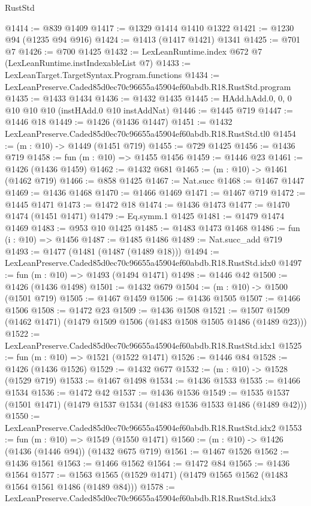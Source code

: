 \begin{lexlean}{RustStd}
\begin{coremodule}
@1414 := @839 @1409
@1417 := @1329 @1414 @1410 @1322
@1421 := @1230 @94 (@1235 @94 @916)
@1424 := @1413 (@1417 @1421) @1341
@1425 := @701 @7
@1426 := @700 @1425
@1432 := LexLeanRuntime.index @672 @7 (LexLeanRuntime.instIndexableList @7)
@1433 := LexLeanTarget.TargetSyntax.Program.functions
@1434 := LexLeanPreserve.Caded85d0ec70c96655a45904ef60abdb.R18.RustStd.program
@1435 := @1433 @1434
@1436 := @1432 @1435
@1445 := HAdd.hAdd.{0, 0, 0} @10 @10 @10 (instHAdd.{0} @10 instAddNat)
@1446 := @1445 @719
@1447 := @1446 @18
@1449 := @1426 (@1436 @1447)
@1451 := @1432 LexLeanPreserve.Caded85d0ec70c96655a45904ef60abdb.R18.RustStd.tl0
@1454 := (m : @10) -> @1449 (@1451 @719)
@1455 := @729 @1425
@1456 := @1436 @719
@1458 := fun (m : @10) => @1455 @1456
@1459 := @1446 @23
@1461 := @1426 (@1436 @1459)
@1462 := @1432 @681
@1465 := (m : @10) -> @1461 (@1462 @719)
@1466 := @858 @1425
@1467 := Nat.succ
@1468 := @1467 @1447
@1469 := @1436 @1468
@1470 := @1466 @1469
@1471 := @1467 @719
@1472 := @1445 @1471
@1473 := @1472 @18
@1474 := @1436 @1473
@1477 := @1470 @1474 (@1451 @1471)
@1479 := Eq.symm.{1} @1425
@1481 := @1479 @1474 @1469
@1483 := @953 @10 @1425
@1485 := @1483 @1473 @1468
@1486 := fun (i : @10) => @1456
@1487 := @1485 @1486
@1489 := Nat.succ_add @719
@1493 := @1477 (@1481 (@1487 (@1489 @18)))
@1494 := LexLeanPreserve.Caded85d0ec70c96655a45904ef60abdb.R18.RustStd.idx0
@1497 := fun (m : @10) => @1493 (@1494 @1471)
@1498 := @1446 @42
@1500 := @1426 (@1436 @1498)
@1501 := @1432 @679
@1504 := (m : @10) -> @1500 (@1501 @719)
@1505 := @1467 @1459
@1506 := @1436 @1505
@1507 := @1466 @1506
@1508 := @1472 @23
@1509 := @1436 @1508
@1521 := @1507 @1509 (@1462 @1471) (@1479 @1509 @1506 (@1483 @1508 @1505 @1486 (@1489 @23)))
@1522 := LexLeanPreserve.Caded85d0ec70c96655a45904ef60abdb.R18.RustStd.idx1
@1525 := fun (m : @10) => @1521 (@1522 @1471)
@1526 := @1446 @84
@1528 := @1426 (@1436 @1526)
@1529 := @1432 @677
@1532 := (m : @10) -> @1528 (@1529 @719)
@1533 := @1467 @1498
@1534 := @1436 @1533
@1535 := @1466 @1534
@1536 := @1472 @42
@1537 := @1436 @1536
@1549 := @1535 @1537 (@1501 @1471) (@1479 @1537 @1534 (@1483 @1536 @1533 @1486 (@1489 @42)))
@1550 := LexLeanPreserve.Caded85d0ec70c96655a45904ef60abdb.R18.RustStd.idx2
@1553 := fun (m : @10) => @1549 (@1550 @1471)
@1560 := (m : @10) -> @1426 (@1436 (@1446 @94)) (@1432 @675 @719)
@1561 := @1467 @1526
@1562 := @1436 @1561
@1563 := @1466 @1562
@1564 := @1472 @84
@1565 := @1436 @1564
@1577 := @1563 @1565 (@1529 @1471) (@1479 @1565 @1562 (@1483 @1564 @1561 @1486 (@1489 @84)))
@1578 := LexLeanPreserve.Caded85d0ec70c96655a45904ef60abdb.R18.RustStd.idx3

\end{coremodule}
\end{lexlean}
